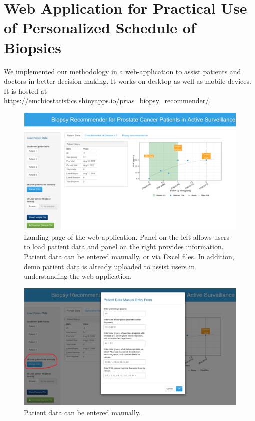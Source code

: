 \section{Web Application for Practical Use of Personalized Schedule of Biopsies}

We implemented our methodology in a web-application to assist patients and doctors in better decision making. It works on desktop as well as mobile devices. It is hosted at \url{https://emcbiostatistics.shinyapps.io/prias_biopsy_recommender/}. 

\begin{figure}[!htb]
\centerline{\includegraphics[width=\columnwidth]{images/app/landing_page.png}}
\caption{Landing page of the web-application. Panel on the left allows users to load patient data and panel on the right provides information. Patient data can be entered manually, or via Excel files. In addition, demo patient data is already uploaded to assist users in understanding the web-application.}
\label{fig:landing_page}
\end{figure}

\begin{figure}
\centerline{\includegraphics[width=\columnwidth]{images/app/manual_entry.png}}
\caption{Patient data can be entered manually.}
\label{fig:manual_entry}
\end{figure}


